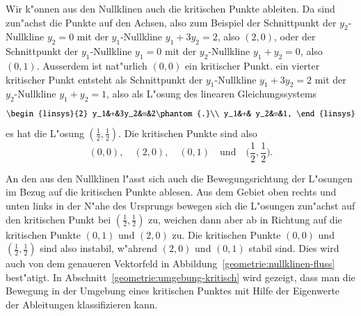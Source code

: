 \begin{beispiel}
Wir k"onnen aus den Nullklinen auch die kritischen Punkte ableiten.
Da sind zun"achst die Punkte auf den Achsen, also zum Beispiel
der Schnittpunkt der $y_2$-Nullkline $y_2=0$ mit der $y_1$-Nullkline
$y_1+3y_2=2$, also $(2,0)$, oder der Schnittpunkt der
$y_1$-Nullkline $y_1=0$ mit der $y_2$-Nullkline $y_1+y_2=0$, also $(0,1)$.
Ausserdem ist nat"urlich $(0,0)$ ein kritischer Punkt.
ein vierter kritischer Punkt entsteht als Schnittpunkt
der $y_1$-Nullkline $y_1+3y_2=2$ mit der $y_2$-Nullkline $y_1+y_2=1$,
also als L"osung des linearen Gleichungssystems
\[
\begin{linsys}{2}
y_1&+&3y_2&=&2\phantom{.}\\
y_1&+& y_2&=&1,
\end{linsys}
\]
es hat die L"osung $(\frac12,\frac12)$.
Die kritischen Punkte sind also
\begin{equation}
(0,0),\quad
(2,0),\quad
(0,1)\quad\text{und}\quad
\biggl(\frac12,\frac12\biggr).
\label{geometrie:nullklinen-krit}
\end{equation}

An den aus den Nullklinen l"asst sich auch die Bewegungsrichtung der
L"osungen im Bezug auf die kritischen Punkte ablesen.
\label{geometrie:nullklinen-stabilitaet}
Aus dem Gebiet oben rechts und unten links in der N"ahe des Ursprungs
bewegen sich die L"osungen zun"achst auf den kritischen Punkt
bei $(\frac12,\frac12)$ zu, weichen dann aber ab in Richtung auf die
kritischen Punkte $(0,1)$ und $(2,0)$ zu.
Die kritischen Punkte $(0,0)$ und $(\frac12,\frac12)$ sind also
instabil, w"ahrend $(2,0)$ und $(0,1)$ stabil sind.
Dies wird auch von dem genaueren Vektorfeld in
Abbildung~\ref{geometrie:nullklinen-fluss} best"atigt.
In Abschnitt~\ref{geometrie:umgebung-kritisch} wird gezeigt, dass man 
die Bewegung in der Umgebung eines kritischen Punktes mit Hilfe der
Eigenwerte der Ableitungen klassifizieren kann.
\end{beispiel}


